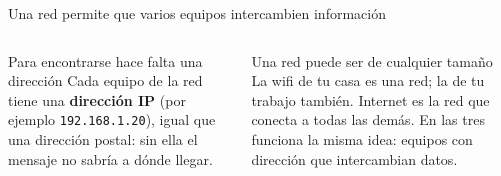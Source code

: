 \documentclass[aspectratio=169,10pt,c]{beamer}
\begin{document}
\begin{frame}{Una red permite que varios equipos intercambien información}
\begin{center}
\end{center}
\begin{columns}[T,onlytextwidth]
\begin{block}{Para encontrarse hace falta una dirección}
\small Cada equipo de la red tiene una \textbf{dirección IP} (por ejemplo \texttt{192.168.1.20}), igual que una dirección postal: sin ella el mensaje no sabría a dónde llegar.
\end{block}
\begin{exampleblock}{Una red puede ser de cualquier tamaño}
\small La wifi de tu casa es una red; la de tu trabajo también. Internet es la red que conecta a todas las demás. En las tres funciona la misma idea: equipos con dirección que intercambian datos.
\end{exampleblock}
\end{columns}
\end{frame}
\end{document}
